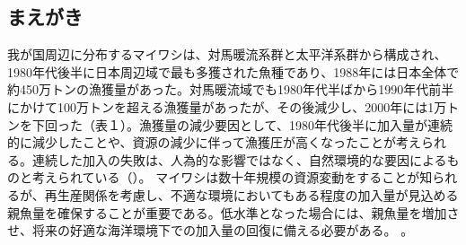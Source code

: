 \subsection{まえがき}
我が国周辺に分布するマイワシは、対馬暖流系群と太平洋系群から構成され、1980年代後半に日本周辺域で最も多獲された魚種であり、1988年には日本全体で約450万トンの漁獲量があった。対馬暖流域でも1980年代半ばから1990年代前半にかけて100万トンを超える漁獲量があったが、その後減少し、2000年には1万トンを下回った（表１）。漁獲量の減少要因として、1980年代後半に加入量が連続的に減少したことや、資源の減少に伴って漁獲圧が高くなったことが考えられる。連続した加入の失敗は、人為的な影響ではなく、自然環境的な要因によるものと考えられている（\citealt{Watanabe1995, Ohshimo2009FO}）。
マイワシは数十年規模の資源変動をすることが知られるが、再生産関係を考慮し、不適な環境においてもある程度の加入量が見込める親魚量を確保することが重要である。低水準となった場合には、親魚量を増加させ、将来の好適な海洋環境下での加入量の回復に備える必要がある。
。
